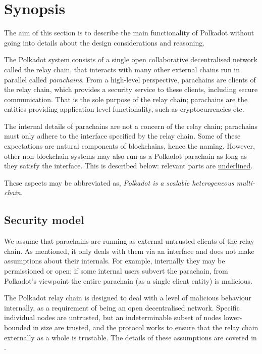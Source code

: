 \section{Synopsis}\label{sec:summary}
The aim of this section is to describe the main functionality of Polkadot without going into details about the design considerations and reasoning. 

The Polkadot system consists of a single open collaborative decentralised network called the relay chain, that interacts with many other external chains run in parallel called \emph{parachains}. From a high-level perspective, parachains are clients of the relay chain, which provides a security service to these clients, including secure communication. That is the sole purpose of the relay chain; parachains are the entities providing application-level functionality, such as cryptocurrencies etc.

The internal details of parachains are not a concern of the relay chain; parachains must only adhere to the interface specified by the relay chain. Some of these expectations are natural components of blockchains, hence the naming. However, other non-blockchain systems may also run as a Polkadot parachain as long as they satisfy the interface. This is described below: relevant parts are \uline{underlined}.

These aspects may be abbreviated as, \emph{Polkadot is a scalable heterogeneous multi-chain}.

\subsection{Security model}

We assume that parachains are running as external untrusted clients of the relay chain. As mentioned, it only deals with them via an interface and does not make assumptions about their internals. For example, internally they may be permissioned or open; if some internal users subvert the parachain, from Polkadot's viewpoint the entire parachain (as a single client entity) is malicious.

The Polkadot relay chain is designed to deal with a level of malicious behaviour internally, as a requirement of being an open decentralised network. Specific individual nodes are untrusted, but an indeterminable subset of nodes lower-bounded in size are trusted, and the protocol works to ensure that the relay chain externally as a whole is trustable. The details of these assumptions are covered in .

